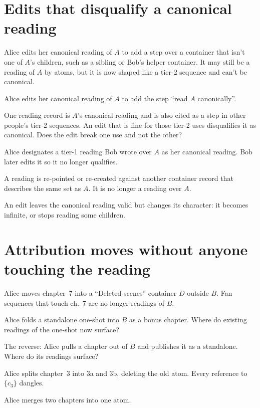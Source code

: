 \documentclass{amsart}
\begin{document}
\section{Edits that disqualify a canonical reading}
\begin{todo}
\item Alice edits her canonical reading of $A$ to add a step over a container that isn't one of $A$'s children, such as a sibling or Bob's helper container. It may still be a reading of $A$ by atoms, but it is now shaped like a tier-2 sequence and can't be canonical.
\item Alice edits her canonical reading of $A$ to add the step ``read $A$ canonically''.
\item One reading record is $A$'s canonical reading and is also cited as a step in other people's tier-2 sequences. An edit that is fine for those tier-2 uses disqualifies it as canonical. Does the edit break one use and not the other?
\item Alice designates a tier-1 reading Bob wrote over $A$ as her canonical reading. Bob later edits it so it no longer qualifies.
\item A reading is re-pointed or re-created against another container record that describes the same set as $A$. It is no longer a reading over $A$.
\item An edit leaves the canonical reading valid but changes its character: it becomes infinite, or stops reading some children.
\end{todo}

\section{Attribution moves without anyone touching the reading}
\begin{todo}
\item Alice moves chapter~7 into a ``Deleted scenes'' container $D$ outside $B$. Fan sequences that touch ch.~7 are no longer readings of $B$.
\item Alice folds a standalone one-shot into $B$ as a bonus chapter. Where do existing readings of the one-shot now surface?
\item The reverse: Alice pulls a chapter out of $B$ and publishes it as a standalone. Where do its readings surface?
\item Alice splits chapter~3 into 3a and 3b, deleting the old atom. Every reference to $\{c_3\}$ dangles.
\item Alice merges two chapters into one atom.
\end{todo}
\end{document}
